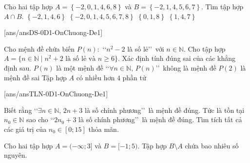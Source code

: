 \begin{ex}%
Cho hai tập hợp $A = \left\{ -2, 0, 1, 4, 6, 8 \right\}$ và $B =\left\{-2, 1, 4, 5, 6, 7\right\}$. Tìm tập hợp $A \cap B$.
\choice
{\True $\left\{ -2, 1, 4, 6\right\}$}
{$\left\{-2, 0, 1, 4, 5, 6, 7, 8\right\}$}
{$\left\{0, 1, 8\right\}$}
{$\left\{1, 4, 7\right\}$}
\end{ex}
\TNTF
[ans/ansDS-0D1-OnChuong-De1]
\begin{ex}%
Cho mệnh đề chứa biến $P(n):$ \lq\lq $n^2-2$ là số lẻ\rq\rq\, với $n\in\mathbb{N}$. Cho tập hợp\\ $A=\{n\in \mathbb{N} \mid n^2+2 \text{ là số lẻ và } n\ge6 \}$. Xác định tính đúng sai của các khẳng định sau.
\choiceTF
{$P(n)$ là một mệnh đề}
{\lq\lq $\forall n\in\mathbb{N},\, P(n)$\rq\rq\, không là mệnh đề}
{\True $P(2)$ là mệnh đề sai}
{Tập hợp $A$ có nhiều hơn $4$ phần tử}
\end{ex}
\TNSA
[ans/ansTLN-0D1-OnChuong-De1]
\begin{ex}%
Biết rằng \lq\lq $\exists n\in\mathbb{N},\, 2n+3$ là số chính phương\rq\rq\, là mệnh đề đúng. Tức là tồn tại $n_0\in \mathbb{N}$ sao cho \lq\lq $2n_0+3$ là số chính phương\rq\rq\, là mệnh đề đúng. Tìm tích tất cả các giá trị của $n_0\in [0;15]$ thỏa mãn.
\end{ex}

\begin{ex}%
Cho hai tập hợp $A=(-\infty ; 3]$ và $B=[-1 ; 5)$. Tập hợp $B \setminus A$ chứa bao nhiêu số nguyên.

\end{ex}

